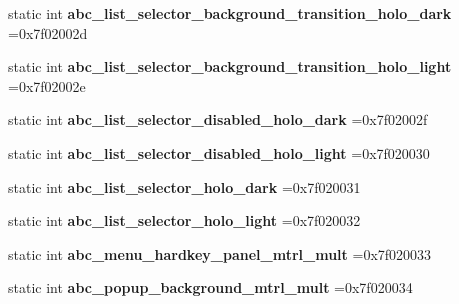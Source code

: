 \begin{DoxyCompactItemize}
static int {\bfseries abc\+\_\+list\+\_\+selector\+\_\+background\+\_\+transition\+\_\+holo\+\_\+dark} =0x7f02002d
\item 
\mbox{\label{classandroid_1_1support_1_1design_1_1R_1_1drawable_ab2bc8f306ed5dedca9cb0d553479bb58}} 
static int {\bfseries abc\+\_\+list\+\_\+selector\+\_\+background\+\_\+transition\+\_\+holo\+\_\+light} =0x7f02002e
\item 
\mbox{\label{classandroid_1_1support_1_1design_1_1R_1_1drawable_aadc960a30de372687b9ca7639a727b68}} 
static int {\bfseries abc\+\_\+list\+\_\+selector\+\_\+disabled\+\_\+holo\+\_\+dark} =0x7f02002f
\item 
\mbox{\label{classandroid_1_1support_1_1design_1_1R_1_1drawable_ad5eaf5f06d6e43d0f3e9777cc35b4851}} 
static int {\bfseries abc\+\_\+list\+\_\+selector\+\_\+disabled\+\_\+holo\+\_\+light} =0x7f020030
\item 
\mbox{\label{classandroid_1_1support_1_1design_1_1R_1_1drawable_a1561a267c5b54f08329943d947f6f55e}} 
static int {\bfseries abc\+\_\+list\+\_\+selector\+\_\+holo\+\_\+dark} =0x7f020031
\item 
\mbox{\label{classandroid_1_1support_1_1design_1_1R_1_1drawable_a18c796c51ee328dddef77f3578ea754e}} 
static int {\bfseries abc\+\_\+list\+\_\+selector\+\_\+holo\+\_\+light} =0x7f020032
\item 
\mbox{\label{classandroid_1_1support_1_1design_1_1R_1_1drawable_a603f38a70f7588465fb8f2c01dc44785}} 
static int {\bfseries abc\+\_\+menu\+\_\+hardkey\+\_\+panel\+\_\+mtrl\+\_\+mult} =0x7f020033
\item 
\mbox{\label{classandroid_1_1support_1_1design_1_1R_1_1drawable_ac09df04854b3f96358f8009a7aee25d8}} 
static int {\bfseries abc\+\_\+popup\+\_\+background\+\_\+mtrl\+\_\+mult} =0x7f020034
\item 
\mbox{\label{classandroid_1_1support_1_1design_1_1R_1_1drawable_a0cde7c1c07eae1d935dea7a3f5185781}} 

\end{DoxyCompactItemize}
